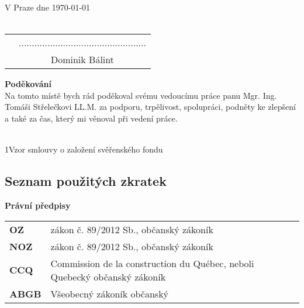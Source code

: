 \documentclass{article}
\begin{document}
\noindent V Praze dne \today\\%
\vspace{10mm} \\
\begin{tabular}{p{6cm}c}
& ................................................. \\
& Dominik Bálint
\end{tabular}

\newpage

\thispagestyle{empty}

\vspace*{\fill}
\noindent \textbf{Poděkování} \\

	Na tomto místě bych rád poděkoval svému vedoucímu práce panu Mgr. Ing. 
Tomáši Střelečkovi LL.M. za podporu, trpělivost, spolupráci, podněty ke zlepšení a 
také za čas, který mi věnoval při vedení práce.

\vspace*{\fill}

\newpage
  \thispagestyle{Contents}
  \tableofcontents
  \listoffigures

\vspace*{0.5cm}
  
\\

\normalsize{1\hspace*{1.8em}Vzor smlouvy o založení svěřenského fondu}

\newpage
 
\begin{center}
\section{Seznam použitých zkratek}
\end{center}

\vspace{5 mm}

\textbf{Právní předpisy}

\vspace{5 mm}

\begin{tabular}{p{3cm}p{8cm}}
\textbf{OZ} & zákon č. 89/2012 Sb., občanský zákoník	 \\
\textbf{NOZ} & zákon č. 89/2012 Sb., občanský zákoník	 \\
\textbf{CCQ} & Commission de la construction du Québec, neboli Quebecký občanský zákoník \\
\textbf{ABGB} & Všeobecný zákoník občanský	 \\
\end{tabular}
\end{document}
